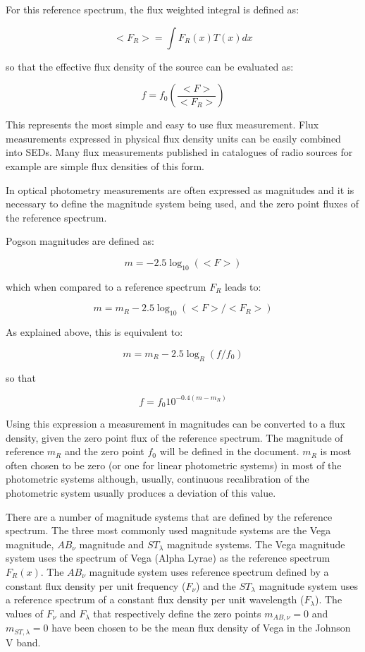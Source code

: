\documentclass[11pt,a4paper]{ivoa}
\begin{document}
For this reference spectrum, the flux weighted integral is defined as:
\par
\[ <F_R > = \int F_R (x)T(x)dx \]

so that the effective flux density of the source can be evaluated as:\par

\[  f = f_0 ( \frac{<F>}{<F_R >} ) \]

This represents the most simple and easy to use flux measurement. Flux measurements expressed in physical flux density units can be easily combined into SEDs. Many flux measurements published in catalogues of radio sources for example are simple flux densities of this form.
\par

In optical photometry measurements are often expressed as magnitudes and it is necessary to define the magnitude system being used, and the zero point fluxes of the reference spectrum.
\par

Pogson magnitudes are defined as:
\par
\[  m = -2.5\log_{10} (<F>) \]

which when compared to a reference spectrum $F_R$ leads to:
\par
\[  m = m_R -2.5 \log_{10} \left( <F>/<F_R >\right) \]

As explained above, this is equivalent to:
\par
\[ m = m_R - 2.5 \log_{R} (f/f_0 ) \]

so that
\par
\[ f = f_0 10^{-0.4(m - m_{R})} \]


Using this expression a measurement in magnitudes can be converted to a flux density, given the zero point flux of the reference spectrum.  The magnitude of reference $m_{R}$ and the zero point $f_0$ will be defined in the document. $m_{R}$ is most often chosen to be zero (or one for linear photometric systems) in most of the photometric systems although, usually, continuous recalibration of the photometric system usually produces a deviation of this value.
\par

There are a number of magnitude systems that are defined by the reference spectrum. The three most commonly used magnitude systems are the Vega magnitude, $AB_{\nu }$ magnitude and $ST_{\lambda }$ magnitude systems. The Vega magnitude system uses the spectrum of Vega (Alpha Lyrae) as the reference spectrum $F_R (x)$. The $AB_{\nu }$ magnitude system uses reference spectrum defined by a constant flux density per unit frequency ($F_{\nu }$) and the
$ST_{\lambda }$ magnitude system uses a reference spectrum of a constant flux density per unit wavelength ($F_{\lambda }$). The values of $F_{\nu }$ and $F_{\lambda }$ that respectively define the zero points
$m_{AB,\nu } =0$ and
$m_{ST,\lambda } =0$ have been chosen to be the mean flux density of Vega in the Johnson V band.
\par
\end{document}
